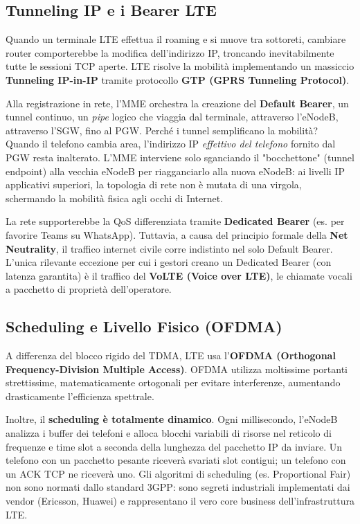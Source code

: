 \subsection{Tunneling IP e i Bearer LTE}
Quando un terminale LTE effettua il roaming e si muove tra sottoreti, cambiare router comporterebbe la modifica dell'indirizzo IP, troncando inevitabilmente tutte le sessioni TCP aperte.
LTE risolve la mobilità implementando un massiccio \textbf{Tunneling IP-in-IP} tramite protocollo \textbf{GTP (GPRS Tunneling Protocol)}.

Alla registrazione in rete, l'MME orchestra la creazione del \textbf{Default Bearer}, un tunnel continuo, un \textit{pipe} logico che viaggia dal terminale, attraverso l'eNodeB, attraverso l'SGW, fino al PGW.
Perché i tunnel semplificano la mobilità?
Quando il telefono cambia area, l'indirizzo IP \textit{effettivo del telefono} fornito dal PGW resta inalterato. L'MME interviene solo sganciando il "bocchettone" (tunnel endpoint) alla vecchia eNodeB per riagganciarlo alla nuova eNodeB: ai livelli IP applicativi superiori, la topologia di rete non è mutata di una virgola, schermando la mobilità fisica agli occhi di Internet.

La rete supporterebbe la QoS differenziata tramite \textbf{Dedicated Bearer} (es. per favorire Teams su WhatsApp). Tuttavia, a causa del principio formale della \textbf{Net Neutrality}, il traffico internet civile corre indistinto nel solo Default Bearer. L'unica rilevante eccezione per cui i gestori creano un Dedicated Bearer (con latenza garantita) è il traffico del \textbf{VoLTE (Voice over LTE)}, le chiamate vocali a pacchetto di proprietà dell'operatore.

\subsection{Scheduling e Livello Fisico (OFDMA)}
A differenza del blocco rigido del TDMA, LTE usa l'\textbf{OFDMA (Orthogonal Frequency-Division Multiple Access)}. OFDMA utilizza moltissime portanti strettissime, matematicamente ortogonali per evitare interferenze, aumentando drasticamente l'efficienza spettrale.

Inoltre, il \textbf{scheduling è totalmente dinamico}. Ogni millisecondo, l'eNodeB analizza i buffer dei telefoni e alloca blocchi variabili di risorse nel reticolo di frequenze e time slot a seconda della lunghezza del pacchetto IP da inviare. Un telefono con un pacchetto pesante riceverà svariati slot contigui; un telefono con un ACK TCP ne riceverà uno. Gli algoritmi di scheduling (es. Proportional Fair) non sono normati dallo standard 3GPP: sono segreti industriali implementati dai vendor (Ericsson, Huawei) e rappresentano il vero core business dell'infrastruttura LTE.

